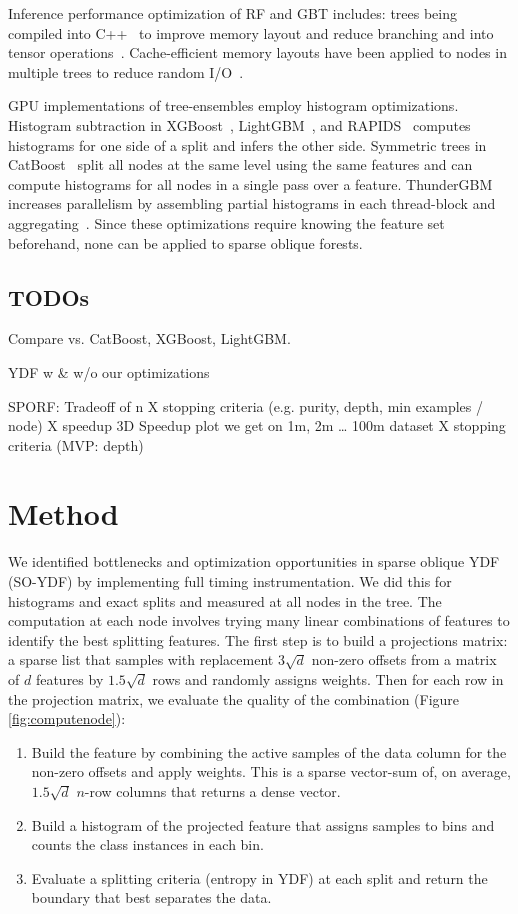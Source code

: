 \documentclass[sigconf]{acmart}
\begin{document}
Inference performance optimization of RF and GBT includes: trees being compiled into C++~\cite{cho2018treelite,rapids} to improve memory layout and reduce branching and into tensor operations~\cite{nakandala2020tensor}. Cache-efficient memory layouts have been applied to nodes in multiple trees to reduce random I/O~\cite{browne2022forestpacking,madhyastha2021blockset}.

GPU implementations of tree-ensembles employ histogram optimizations. Histogram subtraction in XGBoost~\cite{chen2016xgboost}, LightGBM~\cite{ke2017lightgbm}, and RAPIDS~\cite{rapids} computes histograms for one side of a split and infers the other side.
Symmetric trees in CatBoost~\cite{prokhorenkova2018catboost} split all nodes at the same level using the same features and can compute histograms for all nodes in a single pass over a feature. ThunderGBM increases parallelism by assembling partial histograms in each thread-block and aggregating~\cite{wenthundergbm19}. Since these optimizations require knowing the feature set beforehand, none can be applied to sparse oblique forests.

\subsection{TODOs}

Compare vs. CatBoost, XGBoost, LightGBM.

YDF w \& w/o our optimizations

SPORF: Tradeoff of n X stopping criteria (e.g. purity, depth, min examples / node) X speedup
	3D Speedup plot we get on 1m, 2m … 100m dataset X stopping criteria (MVP: depth)

\section{Method}

We identified bottlenecks and optimization opportunities in sparse oblique YDF (SO-YDF) by implementing full timing instrumentation. We did this for histograms and exact splits and measured at all nodes in the tree. 
The computation at each node involves trying many linear combinations of features to identify the best splitting features. The first step is to build a projections matrix: 
a sparse list that samples with replacement $3 \sqrt{d}$ non-zero offsets from a  matrix of $d$ features by $1.5 \sqrt{d}$ rows and randomly assigns weights. Then for each row in the projection matrix, we evaluate the quality of the combination (Figure \ref{fig:computenode}):
\begin{enumerate}
\item Build the feature by combining the active samples of the data column for the non-zero offsets and apply weights. This is a sparse vector-sum of, on average, $1.5 \sqrt{d}$ $n$-row columns that returns a dense vector.
\item Build a histogram of the projected feature that assigns samples to bins and counts the class instances in each bin.
\item Evaluate a splitting criteria (entropy in YDF) at each split and return the boundary that best separates the data.
\end{enumerate}
\end{document}
